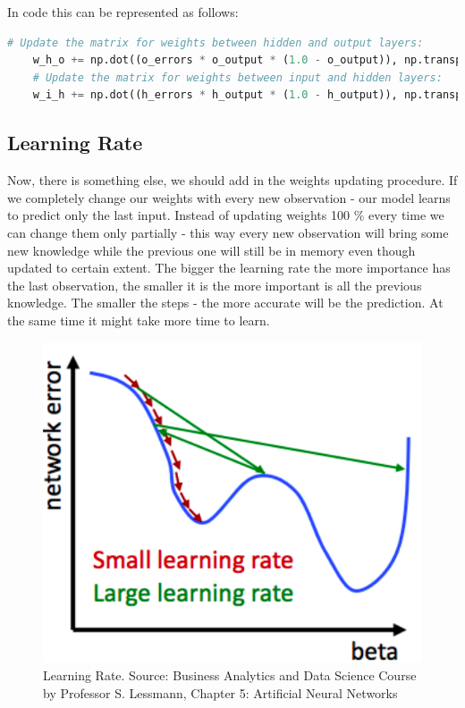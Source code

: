 In code this can be represented as follows:

\begin{lstlisting}[language=Python]
    # Update the matrix for weights between hidden and output layers:
    w_h_o += np.dot((o_errors * o_output * (1.0 - o_output)), np.transpose(h_output)) # 2 can be omitted as being related to the learning rate.
    # Update the matrix for weights between input and hidden layers:
    w_i_h += np.dot((h_errors * h_output * (1.0 - h_output)), np.transpose(input))"
\end{lstlisting}

\subsection{Learning Rate}

Now, there is something else, we should add in the weights updating procedure. If we completely change our weights with every new observation - our model learns to predict only the last input. Instead of updating weights 100 \% every time we can change them only partially - this way every new observation will bring some new knowledge while the previous one will still be in memory even though updated to certain extent. The bigger the learning rate the more importance has the last observation, the smaller it is the more important is all the previous knowledge. The smaller the steps - the more accurate will be the prediction. At the same time it might take more time to learn.

\begin{figure}[H]
    \includegraphics[width=\linewidth]{pics/learning_rate.png}
    \caption{\label{fig:bp} Learning Rate. Source: Business Analytics and Data Science Course by Professor S. Lessmann, Chapter 5: Artificial Neural Networks}
\end{figure}

